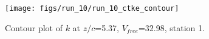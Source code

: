\begin{figure}[H]
\centering
\texttt{[image: figs/run\_10/run\_10\_ctke\_contour]}
\caption{Contour plot of $k$ at $z/c$=5.37, $V_{free}$=32.98, station 1.}
\label{fig:run_10_ctke_contour}
\end{figure}


